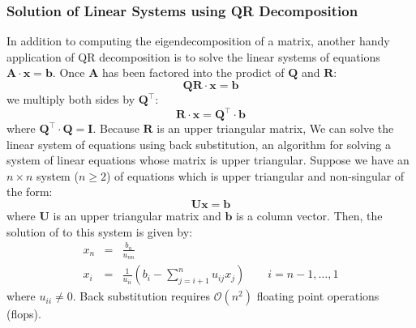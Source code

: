 \documentclass{article}[11pt]
\begin{document}
\subsubsection*{Solution of Linear Systems using QR Decomposition}
In addition to computing the eigendecomposition of a matrix, another handy application of QR decomposition is to solve the linear systems of equations $\mathbf{A}\cdot\mathbf{x} = \mathbf{b}$.
Once $\mathbf{A}$ has been factored into the prodict of $\mathbf{Q}$ and $\mathbf{R}$:
\begin{equation}
\mathbf{Q}\mathbf{R}\cdot\mathbf{x} = \mathbf{b}
\end{equation}
we multiply both sides by $\mathbf{Q}^{\top}$:
\begin{equation}
\mathbf{R}\cdot\mathbf{x} = \mathbf{Q}^{\top}\cdot\mathbf{b}
\end{equation}
where $\mathbf{Q}^{\top}\cdot\mathbf{Q} = \mathbf{I}$. Because $\mathbf{R}$ is an upper triangular matrix, 
We can solve the linear system of equations using back substitution, an algorithm for solving a system of linear equations whose matrix is upper triangular.
Suppose we have an $n\times{n}$ system ($n\geq{2}$) of equations which is upper triangular and non-singular of the form:
\begin{equation*}
\mathbf{U}\mathbf{x} = \mathbf{b}
\end{equation*}
where $\mathbf{U}$ is an upper triangular matrix and $\mathbf{b}$ is a column vector.
Then, the solution of to this system is given by:
\begin{eqnarray*}
x_{n} & = & \frac{b_{n}}{u_{nn}} \\
x_{i} & = & \frac{1}{u_{ii}}\left(b_{i} - \sum_{j=i+1}^{n}u_{ij}x_{j}\right)\qquad{i=n-1,\dots,1}
\end{eqnarray*}
where $u_{ii}\neq{0}$. Back substitution requires $\mathcal{O}(n^{2})$ floating point operations (flops).
\end{document}
